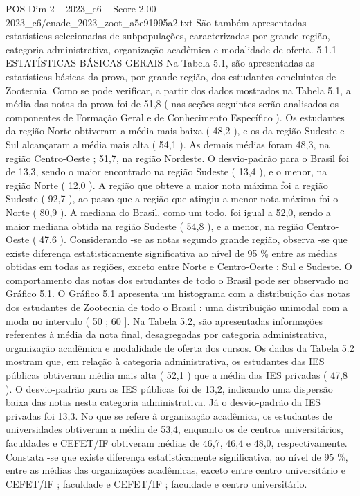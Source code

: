\begin{textsample}{POS Dim 2 – 2023\_c6 – Score 2.00 – 2023\_c6/enade\_2023\_zoot\_a5e91995a2.txt}
São também apresentadas estatísticas selecionadas de subpopulações, caracterizadas por grande região, categoria administrativa, organização acadêmica e modalidade de oferta. 5.1.1 ESTATÍSTICAS BÁSICAS GERAIS Na Tabela 5.1, são apresentadas as estatísticas básicas da prova, por grande região, dos estudantes concluintes de Zootecnia.
Como se pode verificar, a partir dos dados mostrados na Tabela 5.1, a média das notas da prova foi de 51,8 ( nas seções seguintes serão analisados os componentes de Formação Geral e de Conhecimento Específico ).
Os estudantes da região Norte obtiveram a média mais baixa ( 48,2 ), e os da região Sudeste e Sul alcançaram a média mais alta ( 54,1 ).
As demais médias foram 48,3, na região Centro-Oeste ; 51,7, na região Nordeste.
O desvio-padrão para o Brasil foi de 13,3, sendo o maior encontrado na região Sudeste ( 13,4 ), e o menor, na região Norte ( 12,0 ).
A região que obteve a maior nota máxima foi a região Sudeste ( 92,7 ), ao passo que a região que atingiu a menor nota máxima foi o Norte ( 80,9 ).
A mediana do Brasil, como um todo, foi igual a 52,0, sendo a maior mediana obtida na região Sudeste ( 54,8 ), e a menor, na região Centro-Oeste ( 47,6 ).
Considerando -se as notas segundo grande região, observa -se que existe diferença estatisticamente significativa ao nível de 95 \% entre as médias obtidas em todas as regiões, exceto entre Norte e Centro-Oeste ; Sul e Sudeste.
O comportamento das notas dos estudantes de todo o Brasil pode ser observado no Gráfico 5.1.
O Gráfico 5.1 apresenta um histograma com a distribuição das notas dos estudantes de Zootecnia de todo o Brasil : uma distribuição unimodal com a moda no intervalo ( 50 ; 60 ].
Na Tabela 5.2, são apresentadas informações referentes à média da nota final, desagregadas por categoria administrativa, organização acadêmica e modalidade de oferta dos cursos.
Os dados da Tabela 5.2 mostram que, em relação à categoria administrativa, os estudantes das IES públicas obtiveram média mais alta ( 52,1 ) que a média das IES privadas ( 47,8 ).
O desvio-padrão para as IES públicas foi de 13,2, indicando uma dispersão baixa das notas nesta categoria administrativa.
Já o desvio-padrão da IES privadas foi 13,3.
No que se refere à organização acadêmica, os estudantes de universidades obtiveram a média de 53,4, enquanto os de centros universitários, faculdades e CEFET/IF obtiveram médias de 46,7, 46,4 e 48,0, respectivamente.
Constata -se que existe diferença estatisticamente significativa, ao nível de 95 \%, entre as médias das organizações acadêmicas, exceto entre centro universitário e CEFET/IF ; faculdade e CEFET/IF ; faculdade e centro universitário.

\end{textsample}
